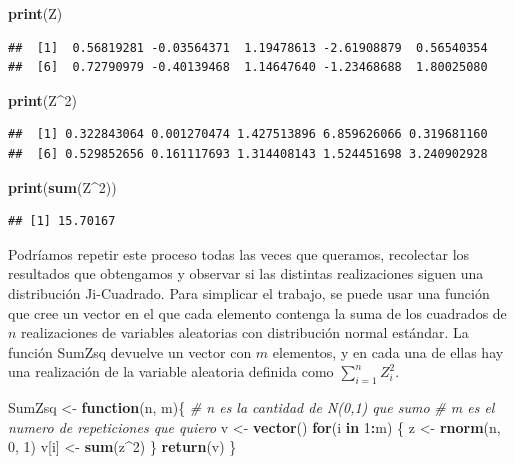 \documentclass[]{article}
\newenvironment{Shaded}{\begin{snugshade}}{\end{snugshade}}
\newcommand{\CommentTok}[1]{\textcolor[rgb]{0.56,0.35,0.01}{\textit{#1}}}
\newcommand{\ControlFlowTok}[1]{\textcolor[rgb]{0.13,0.29,0.53}{\textbf{#1}}}
\newcommand{\DecValTok}[1]{\textcolor[rgb]{0.00,0.00,0.81}{#1}}
\newcommand{\KeywordTok}[1]{\textcolor[rgb]{0.13,0.29,0.53}{\textbf{#1}}}
\newcommand{\NormalTok}[1]{#1}
\newcommand{\OperatorTok}[1]{\textcolor[rgb]{0.81,0.36,0.00}{\textbf{#1}}}
\newcommand{\StringTok}[1]{\textcolor[rgb]{0.31,0.60,0.02}{#1}}
\begin{document}
\begin{Shaded}
\begin{Highlighting}[]
\KeywordTok{print}\NormalTok{(Z)}
\end{Highlighting}
\end{Shaded}

\begin{verbatim}
##  [1]  0.56819281 -0.03564371  1.19478613 -2.61908879  0.56540354
##  [6]  0.72790979 -0.40139468  1.14647640 -1.23468688  1.80025080
\end{verbatim}

\begin{Shaded}
\begin{Highlighting}[]
\KeywordTok{print}\NormalTok{(Z}\OperatorTok{^}\DecValTok{2}\NormalTok{)}
\end{Highlighting}
\end{Shaded}

\begin{verbatim}
##  [1] 0.322843064 0.001270474 1.427513896 6.859626066 0.319681160
##  [6] 0.529852656 0.161117693 1.314408143 1.524451698 3.240902928
\end{verbatim}

\begin{Shaded}
\begin{Highlighting}[]
\KeywordTok{print}\NormalTok{(}\KeywordTok{sum}\NormalTok{(Z}\OperatorTok{^}\DecValTok{2}\NormalTok{))}
\end{Highlighting}
\end{Shaded}

\begin{verbatim}
## [1] 15.70167
\end{verbatim}

Podríamos repetir este proceso todas las veces que queramos, recolectar
los resultados que obtengamos y observar si las distintas realizaciones
siguen una distribución Ji-Cuadrado. Para simplicar el trabajo, se puede
usar una función que cree un vector en el que cada elemento contenga la
suma de los cuadrados de \(n\) realizaciones de variables aleatorias con
distribución normal estándar. La función SumZsq devuelve un vector con
\(m\) elementos, y en cada una de ellas hay una realización de la
variable aleatoria definida como \(\sum_{i=1}^n Z_i^2\).

\begin{Shaded}
\begin{Highlighting}[]
\NormalTok{ SumZsq <-}\StringTok{ }\ControlFlowTok{function}\NormalTok{(n, m)\{}
  \CommentTok{# n es la cantidad de N(0,1) que sumo}
  \CommentTok{# m es el numero de repeticiones que quiero}
\NormalTok{  v <-}\StringTok{ }\KeywordTok{vector}\NormalTok{()}
  \ControlFlowTok{for}\NormalTok{(i }\ControlFlowTok{in} \DecValTok{1}\OperatorTok{:}\NormalTok{m) \{}
\NormalTok{    z <-}\StringTok{ }\KeywordTok{rnorm}\NormalTok{(n, }\DecValTok{0}\NormalTok{, }\DecValTok{1}\NormalTok{)}
\NormalTok{    v[i] <-}\StringTok{ }\KeywordTok{sum}\NormalTok{(z}\OperatorTok{^}\DecValTok{2}\NormalTok{)}
\NormalTok{  \}}
  \KeywordTok{return}\NormalTok{(v)}
\NormalTok{ \}}
\end{Highlighting}
\end{Shaded}
\end{document}
